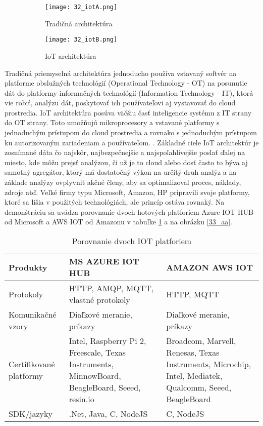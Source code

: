 \begin{figure}[h]
\centering
\begin{subfigure}{0.5\linewidth}
\texttt{[image: 32\_iotA.png]}
\caption{Tradičná architektúra \cite{IOT21}}
\label{32_iotA}
\end{subfigure}%
\begin{subfigure}{0.5\linewidth}
\texttt{[image: 32\_iotB.png]}
\caption{IoT architektúra \cite{IOT21}}
\label{32_iotB}
\end{subfigure}
\caption{}
\end{figure}
Tradičná priemyselná architektúra jednoducho používa vstavaný softvér na platforme obslužných technológií (Operational Technology - OT) na posunutie dát do platformy informačných technológií (Information Technology - IT), ktorá vie robiť, analýzu dát, poskytovať ich používateľovi aj vystavovať do cloud prostredia. IoT architektúra posúva väčšiu časť inteligencie systému z IT strany do OT strany. Toto umožňujú mikroprocesory a vstavané platformy s jednoduchým prístupom do cloud prostredia a rovnako s jednoduchým prístupom ku autorizovaným zariadeniam a používateľom. \cite{IOT21}. 
\indent Základné ciele IoT architektúr je zosnímané dáta čo najskôr, najbezpečnejšie a najspoľahlivejšie poslať ďalej na miesto, kde môžu prejsť analýzou, či už je to cloud alebo dosť často to býva aj samotný agregátor, ktorý má dostatočný výkon na určitý druh analýz a na základe analýzy ovplyvniť akčné členy, aby sa optimalizoval proces, náklady, zdroje atď. Veľké firmy typu Microsoft, Amazon, HP pripravili svoje platformy, ktoré sa líšia v použitých technológiách, ale princíp ostáva rovnaký. Na demonštráciu sa uvádza porovnanie dvoch hotových platforiem Azure IOT HUB od Microsoft a AWS IOT od Amazonu v tabuľke \ref{table:1} a na obrázku \ref{33_aa}.
\begin{table}[h!]
\centering
 \caption{Porovnanie dvoch IOT platforiem \cite{IOT22} }
 \begin{tabular}{ |p{4cm}|p{5.5cm}p{5.5cm}| } 
 \hline
 Produkty & MS AZURE IOT HUB & AMAZON AWS IOT \\ 
 \hline\hline
 Protokoly & HTTP, AMQP, MQTT, vlastné protokoly & HTTP, MQTT  \\ 
 \hline
 Komunikačné vzory & Diaľkové meranie, príkazy & Diaľkové meranie, príkazy \\
 \hline
 Certifikované platformy &  Intel, Raspberry Pi 2, Freescale, Texas Instruments, MinnowBoard, BeagleBoard, Seeed, resin.io & 
Broadcom, Marvell, Renesas, Texas Instruments, Microchip, Intel, Mediatek, Qualcomm, Seeed, BeagleBoard \\
 \hline
 SDK/jazyky & 	.Net, Java, C, NodeJS & C, NodeJS \\
 \hline
\end{tabular}
\label{table:1}
\end{table}

